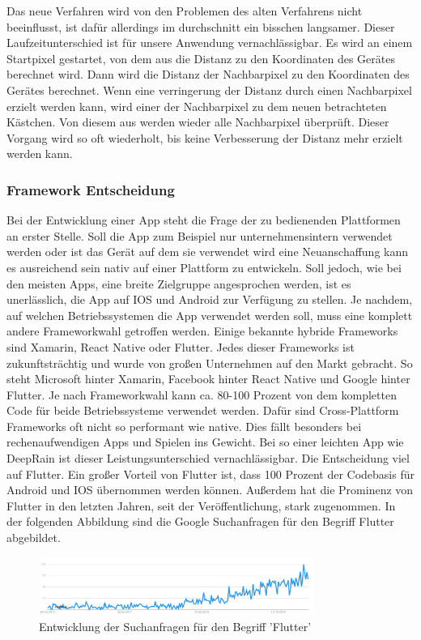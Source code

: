  \noindent 
 Das neue Verfahren wird von den Problemen des alten Verfahrens nicht beeinflusst, ist dafür allerdings im durchschnitt ein bisschen langsamer. 
 Dieser Laufzeitunterschied ist für unsere Anwendung vernachlässigbar. 
 Es wird an einem Startpixel gestartet, von dem aus die Distanz zu den Koordinaten des Gerätes berechnet wird. 
 Dann wird die Distanz der Nachbarpixel zu den Koordinaten des Gerätes berechnet. 
 Wenn eine verringerung der Distanz durch einen Nachbarpixel erzielt werden kann, wird einer der Nachbarpixel zu dem neuen betrachteten Kästchen. 
 Von diesem aus werden wieder alle Nachbarpixel überprüft. 
 Dieser Vorgang wird so oft wiederholt, bis keine Verbesserung der Distanz mehr erzielt werden kann.

\subsubsection{Framework Entscheidung}\label{framework entscheidung}
Bei der Entwicklung einer App steht die Frage der zu bedienenden Plattformen an erster Stelle. Soll die App zum Beispiel nur unternehmensintern verwendet 
werden oder ist das Gerät auf dem sie verwendet wird eine Neuanschaffung kann es ausreichend sein nativ auf einer Plattform zu entwickeln. Soll jedoch, 
wie bei den meisten Apps, eine breite Zielgruppe angesprochen werden, ist es unerlässlich, die App auf IOS und Android zur Verfügung zu stellen. 
Je nachdem, auf welchen Betriebssystemen die App verwendet werden soll, muss eine komplett andere Frameworkwahl getroffen werden. 
Einige bekannte hybride Frameworks sind Xamarin, React Native oder Flutter. Jedes dieser Frameworks ist zukunftsträchtig und wurde von großen 
Unternehmen auf den Markt gebracht. So steht Microsoft hinter Xamarin, Facebook hinter React Native und Google hinter Flutter. 
Je nach Frameworkwahl kann ca. 80-100 Prozent von dem kompletten Code für beide Betriebssysteme verwendet werden. 
Dafür sind Cross-Plattform Frameworks oft nicht so performant wie native. Dies fällt besonders bei rechenaufwendigen Apps und Spielen ins Gewicht. 
Bei so einer leichten App wie DeepRain ist dieser Leistungsunterschied vernachlässigbar.
Die Entscheidung viel auf Flutter.
Ein großer Vorteil von Flutter ist, dass 100 Prozent der Codebasis für Android und IOS übernommen werden können. Außerdem hat die Prominenz von 
Flutter in den letzten Jahren, seit der Veröffentlichung, stark zugenommen. In der folgenden Abbildung sind die Google Suchanfragen für den Begriff 
Flutter abgebildet. 
\begin{figure}[H]
 \centering
 \includegraphics[width=0.8\textwidth,angle=0]{abb/flutter_google_trends}
 \caption[Entwicklung von Flutter]{Entwicklung der Suchanfragen für den Begriff 'Flutter'}
\label{fig:flutter_google_trends}
\end{figure}


